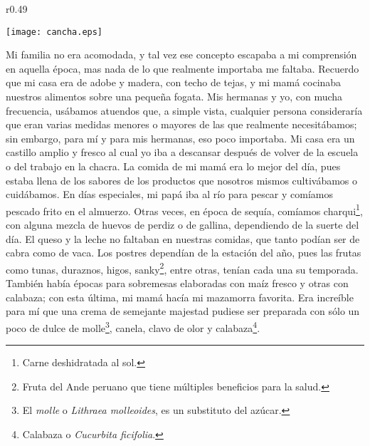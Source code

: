 \ifdefined\EnableIncludeImages
\begin{wrapfigure}{r}{0.49\textwidth}
  \begin{center}
  \vspace{-20pt}
    \texttt{[image: cancha.eps]}
  \end{center}
  \vspace{-20pt}
\end{wrapfigure}
\fi
Mi familia no era acomodada, y tal vez ese concepto escapaba a mi comprensión en aquella época, mas nada de lo que realmente importaba me faltaba.   
Recuerdo que mi casa era de adobe y madera, con techo de tejas, y mi mamá cocinaba nuestros alimentos sobre una pequeña fogata. Mis hermanas y yo, con mucha frecuencia, usábamos atuendos que, a simple vista, cualquier persona consideraría que eran varias medidas menores o mayores de las que realmente necesitábamos;
sin embargo, para mí y para mis hermanas, eso poco importaba. Mi casa era un castillo amplio y fresco al cual yo iba a descansar después de volver de la escuela o del trabajo en la chacra.
La comida de mi mamá era lo mejor del día, pues estaba llena de los sabores de los productos que nosotros mismos cultivábamos o cuidábamos. 
En días especiales, mi papá iba al río para pescar y comíamos pescado frito en el almuerzo. Otras veces, en época de sequía, comíamos charqui\footnote{Carne deshidratada al sol.}, con alguna mezcla de huevos de perdiz o de gallina, dependiendo de la suerte del día.
El queso y la leche no faltaban en nuestras comidas, que tanto podían ser de cabra como de vaca.
Los postres dependían de la estación del año, pues las frutas como tunas, duraznos, higos, sanky\footnote{Fruta del Ande peruano que tiene múltiples beneficios para la salud.}, entre otras, tenían cada una su temporada. También había épocas para sobremesas elaboradas con maíz fresco y otras con calabaza; con esta última, mi mamá hacía mi mazamorra favorita. Era increíble para mí que una crema de semejante majestad pudiese ser preparada con sólo un poco de dulce de molle\footnote{El \textit{molle} o \textit{Lithraea molleoides}, es un substituto del azúcar.}, canela, clavo de olor y calabaza\footnote{Calabaza o \textit{Cucurbita ficifolia}.}.

